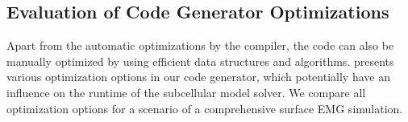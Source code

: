




\subsection{Evaluation of Code Generator Optimizations}\label{sec:evaluation_of_code_gen}

Apart from the automatic optimizations by the compiler, the code can also be manually optimized by using efficient data structures and algorithms.  presents various optimization options in our code generator, which potentially have an influence on the runtime of the subcellular model solver. 
We compare all optimization options for a scenario of a comprehensive surface EMG simulation. 

